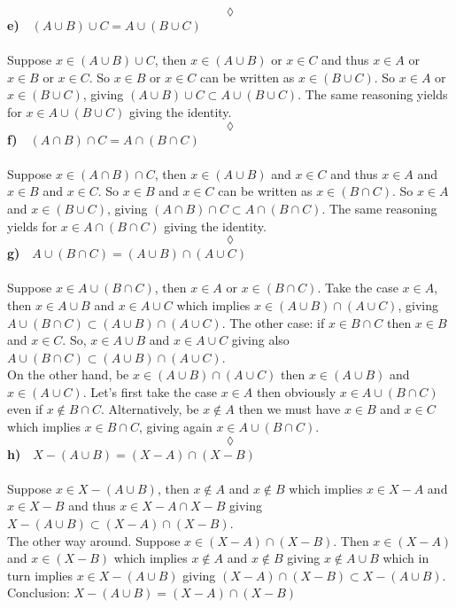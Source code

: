 $$\lozenge$$
\textbf{e)}$\quad (A\cup B)\cup C= A\cup(B\cup C) $\\\\
 Suppose $x \in (A\cup B)\cup C$, then $x \in (A\cup B)$ or $x\in C$ and thus $x\in A$ or $x\in B$ or $x\in C$. So  $x\in B$ or  $x\in C$  can be written as $x\in (B\cup C)$. So $x\in A$ or $x\in (B\cup C)$, giving $(A\cup B)\cup C\subset A\cup(B\cup C)$. The same reasoning yields for $x\in A\cup(B\cup C)$ giving the identity.
$$\lozenge$$
\textbf{f)}$\quad (A\cap B)\cap C= A\cap(B\cap C)$\\\\
 Suppose $x \in (A\cap B)\cap C$, then $x \in (A\cup B)$ and $x\in C$ and thus $x\in A$ and $x\in B$ and $x\in C$. So  $x\in B$ and  $x\in C$  can be written as $x\in (B\cap C)$. So $x\in A$ and $x\in (B\cup C)$, giving $(A\cap B)\cap C\subset A\cap(B\cap C)$. The same reasoning yields for $x\in A\cap(B\cap C)$ giving the identity.
$$\lozenge$$
\textbf{g)}$\quad A\cup (B\cap C)= (A\cup B)\cap (A\cup C)$\\\\
 Suppose $x \in A\cup (B\cap C)$, then $x \in A$ or $x\in (B\cap C)$.  Take the case $x\in A$, then  $x\in A\cup B$ and  $x\in A\cup C$ which implies $x\in (A\cup B)\cap (A\cup C)$, giving $A\cup (B\cap C)\subset (A\cup B)\cap (A\cup C)$. The other case:  if $x\in B\cap C$ then $x\in B$ and $x\in C$. So, $x \in A\cup B$ and $x\in A\cup C$ giving also $A\cup (B\cap C)\subset (A\cup B)\cap (A\cup C)$.\\
 On the other hand,  be $x \in (A\cup B)\cap (A\cup C)$ then $x \in (A\cup B)$  and $x \in (A\cup C)$. Let's first take the case $x\in A$ then obviously $x\in A\cup (B\cap C)$ even if $x\not\in  B\cap C$. Alternatively, be $x\not \in A$ then we must have $x \in B$ and $x\in C$ which implies $x\in B\cap C$, giving again $x\in A\cup (B\cap C)$.
$$\lozenge$$
\textbf{h)}$\quad X-(A\cup B) = (X-A)\cap (X-B)$\\\\
 Suppose $x\in X-(A\cup B)$, then $x \not\in A$ and $x \not\in B$ which implies $x \in X-A$ and $x \in X-B$ and thus $x \in X-A\cap X-B$ giving $X-(A\cup B) \subset (X-A)\cap (X-B)$.\\
 The other way around. Suppose $x\in(X-A)\cap (X-B)$. Then $x\in(X-A)$ and $x\in(X-B)$ which implies  $x\not \in A$ and $x\not \in B$ giving $x\not \in A \cup B$ which in turn implies $x\in X-(A\cup B)$ giving $(X-A)\cap (X-B)\subset  X-(A\cup B)$.\\Conclusion: $ X-(A\cup B) = (X-A)\cap (X-B)$
